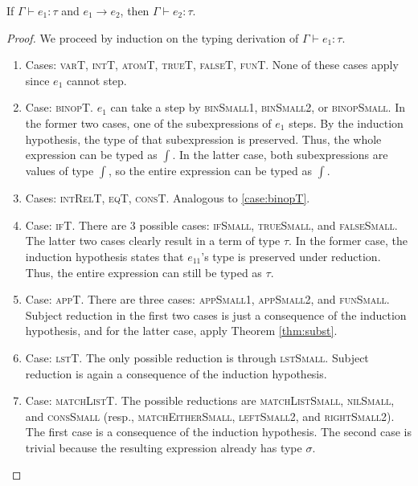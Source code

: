 \documentclass{homework}
\begin{document}
\begin{thm}[Preservation]
  If $\Gamma \vdash e_1 : \tau$ and $e_1 \to e_2$, then $\Gamma \vdash e_2 : \tau$.
\end{thm}
\begin{proof}
  We proceed by induction on the typing derivation of $\Gamma \vdash e_{1} : \tau$.
  \begin{enumerate}
  \item Cases: \textsc{varT}, \textsc{intT}, \textsc{atomT}, \textsc{trueT}, \textsc{falseT}, \textsc{funT}.
    None of these cases apply since $e_{1}$ cannot step.
  \item\label{case:binopT} Case: \textsc{binopT}.
    $e_{1}$ can take a step by \textsc{binSmall1}, \textsc{binSmall2}, or \textsc{binopSmall}.
    In the former two cases, one of the subexpressions of $e_{1}$ steps.
    By the induction hypothesis, the type of that subexpression is preserved.
    Thus, the whole expression can be typed as $\int$.
    In the latter case, both subexpressions are values of type $\int$, so the entire expression can be typed as $\int$.
  \item Cases: \textsc{intRelT}, \textsc{eqT}, \textsc{consT}.
    Analogous to \ref{case:binopT}.
  \item Case: \textsc{ifT}.
    There are 3 possible cases: \textsc{ifSmall}, \textsc{trueSmall}, and \textsc{falseSmall}.
    The latter two cases clearly result in a term of type $\tau$.
    In the former case, the induction hypothesis states that $e_{11}$'s type is preserved under reduction.
    Thus, the entire expression can still be typed as $\tau$.
  \item Case: \textsc{appT}.
    There are three cases: \textsc{appSmall1}, \textsc{appSmall2}, and \textsc{funSmall}.
    Subject reduction in the first two cases is just a consequence of the induction hypothesis, and for the latter case, apply Theorem \ref{thm:subst}.
  \item Case: \textsc{lstT}.
    The only possible reduction is through \textsc{lstSmall}.
    Subject reduction is again a consequence of the induction hypothesis.
  \item\label{case:matchListT} Case: \textsc{matchListT}.
    The possible reductions are \textsc{matchListSmall}, \textsc{nilSmall}, and \textsc{consSmall} (resp., \textsc{matchEitherSmall}, \textsc{leftSmall2}, and \textsc{rightSmall2}).
    The first case is a consequence of the induction hypothesis.
    The second case is trivial because the resulting expression already has type $\sigma$.

\end{enumerate}
\end{proof}
\end{document}
